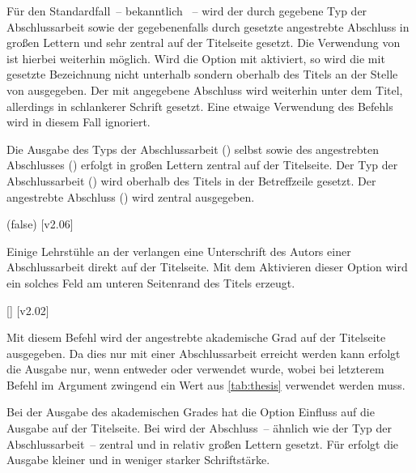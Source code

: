 \begin{DeclareEntity*}{}
\begin{DeclareEntity*}{}
\begin{DeclareEntity*}{}
\begin{Declaration}
Für den Standardfall~-- bekanntlich ~-- wird der 
durch  gegebene Typ der Abschlussarbeit sowie der gegebenenfalls 
durch  gesetzte angestrebte Abschluss in großen Lettern und 
sehr zentral auf der Titelseite gesetzt. Die Verwendung von  ist 
hierbei weiterhin möglich.
%
Wird die Option mit  aktiviert, so wird die mit 
 gesetzte Bezeichnung nicht unterhalb sondern oberhalb des Titels 
an der Stelle von  ausgegeben. Der mit  
angegebene Abschluss wird weiterhin unter dem Titel, allerdings in schlankerer 
Schrift gesetzt. Eine etwaige Verwendung des Befehls  wird in 
diesem Fall ignoriert.
\begin{DeclareValues}
  Die Ausgabe des Typs der Abschlussarbeit () selbst sowie des 
  angestrebten Abschlusses () erfolgt in großen Lettern 
  zentral auf der Titelseite.
  Der Typ der Abschlussarbeit () wird oberhalb des Titels in der 
  Betreffzeile gesetzt. Der angestrebte Abschluss () wird 
  zentral ausgegeben.
\end{DeclareValues}
\end{Declaration}

\begin{Declaration}
  {}
  (false)
  [v2.06]
\printdeclarationlist

Einige Lehrstühle an der \TnUD verlangen eine Unterschrift des Autors einer 
Abschlussarbeit direkt auf der Titelseite. Mit dem Aktivieren dieser Option 
wird ein solches Feld am unteren Seitenrand des Titels erzeugt.
\end{Declaration}

\begin{Declaration}
  {[]}
  [v2.02]
\printdeclarationlist

Mit diesem Befehl wird der angestrebte akademische Grad auf der Titelseite 
ausgegeben. Da dies nur mit einer Abschlussarbeit erreicht werden kann erfolgt 
die Ausgabe nur, wenn entweder  oder  verwendet 
wurde, wobei bei letzterem Befehl im Argument zwingend ein Wert aus 
\autoref{tab:thesis} verwendet werden muss.

Bei der Ausgabe des akademischen Grades hat die Option  
Einfluss auf die Ausgabe auf der Titelseite. Bei  
wird der Abschluss~-- ähnlich wie der Typ der Abschlussarbeit~-- zentral und in 
relativ großen Lettern gesetzt. Für  erfolgt die 
Ausgabe kleiner und in weniger starker Schriftstärke.
\end{Declaration}


\end{DeclareEntity*}
\end{DeclareEntity*}
\end{DeclareEntity*}
